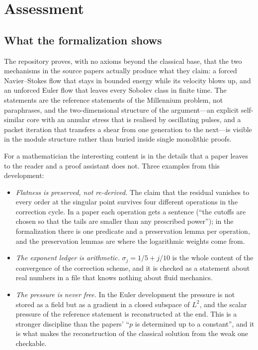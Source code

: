 \section{Assessment}
\label{sec:assessment}

\subsection{What the formalization shows}

The repository proves, with no axioms beyond the classical base, that the two mechanisms in
the source papers actually produce what they claim: a forced Navier--Stokes flow that stays
in bounded energy while its velocity blows up, and an unforced Euler flow that leaves every
Sobolev class in finite time. The statements are the reference statements of the Millennium
problem, not paraphrases, and the two-dimensional structure of the argument---an explicit
self-similar core with an annular stress that is realised by oscillating pulses, and a
packet iteration that transfers a shear from one generation to the next---is visible in the
module structure rather than buried inside single monolithic proofs.

For a mathematician the interesting content is in the details that a paper leaves to the
reader and a proof assistant does not. Three examples from this development:

\begin{itemize}
\item \emph{Flatness is preserved, not re-derived.} The claim that the residual vanishes to
      every order at the singular point survives four different operations in the correction
      cycle. In a paper each operation gets a sentence (``the cutoffs are chosen so that the
      tails are smaller than any prescribed power''); in the formalization there is one
      predicate and a preservation lemma per operation, and the preservation lemmas are
      where the logarithmic weights come from.
\item \emph{The exponent ledger is arithmetic.} $\sigma_j=1/5+j/10$ is the whole content of
      the convergence of the correction scheme, and it is checked as a statement about real
      numbers in a file that knows nothing about fluid mechanics.
\item \emph{The pressure is never free.} In the Euler development the pressure is not stored
      as a field but as a gradient in a closed subspace of $L^2$, and the scalar pressure of
      the reference statement is reconstructed at the end. This is a stronger discipline than
      the papers' ``$p$ is determined up to a constant'', and it is what makes the
      reconstruction of the classical solution from the weak one checkable.
\end{itemize}

